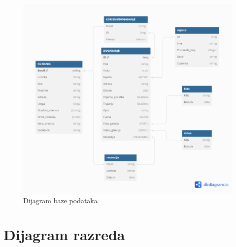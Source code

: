 				
		\begin{figure}[H]
			\includegraphics[width=\textwidth]{slike/Dijagram_baza.PNG} %
			\caption{Dijagram baze podataka}
			\label{fig:DB} %
		\end{figure}
			\eject
			
			
		\section{Dijagram razreda}
		
		

		
